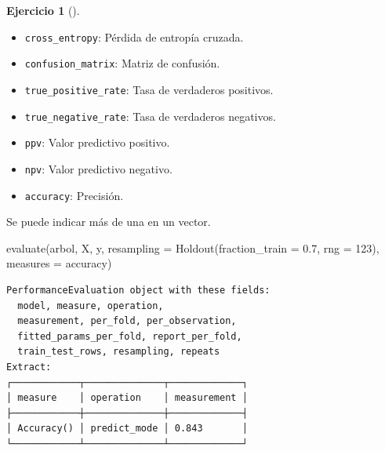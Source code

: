 \documentclass[
  a4paper,
]{scrreport}
\newenvironment{Shaded}{\begin{snugshade}}{\end{snugshade}}
\newcommand{\FloatTok}[1]{\textcolor[rgb]{0.68,0.00,0.00}{#1}}
\newcommand{\FunctionTok}[1]{\textcolor[rgb]{0.28,0.35,0.67}{#1}}
\newcommand{\NormalTok}[1]{\textcolor[rgb]{0.00,0.23,0.31}{#1}}
\newcommand{\OperatorTok}[1]{\textcolor[rgb]{0.37,0.37,0.37}{#1}}
\providecommand{\tightlist}{%
  \setlength{\itemsep}{0pt}\setlength{\parskip}{0pt}}\usepackage{longtable,booktabs,array}
\theoremstyle{definition}
\newtheorem{exercise}{Ejercicio}[chapter]
\theoremstyle{remark}
\begin{document}
\begin{exercise}[]
\begin{enumerate}
\begin{tcolorbox}
\begin{itemize}
    \begin{itemize}
    \tightlist
    \item
      \texttt{cross\_entropy}: Pérdida de entropía cruzada.
    \item
      \texttt{confusion\_matrix}: Matriz de confusión.
    \item
      \texttt{true\_positive\_rate}: Tasa de verdaderos positivos.
    \item
      \texttt{true\_negative\_rate}: Tasa de verdaderos negativos.
    \item
      \texttt{ppv}: Valor predictivo positivo.
    \item
      \texttt{npv}: Valor predictivo negativo.
    \item
      \texttt{accuracy}: Precisión.
    \end{itemize}

    Se puede indicar más de una en un vector.
  \end{itemize}

  \end{tcolorbox}

  \begin{tcolorbox}[enhanced jigsaw, toptitle=1mm, breakable, toprule=.15mm, opacitybacktitle=0.6, coltitle=black, titlerule=0mm, arc=.35mm, title=\textcolor{quarto-callout-tip-color}{\faLightbulb}\hspace{0.5em}{Solución}, rightrule=.15mm, opacityback=0, colback=white, bottomrule=.15mm, leftrule=.75mm, colbacktitle=quarto-callout-tip-color!10!white, bottomtitle=1mm, colframe=quarto-callout-tip-color-frame, left=2mm]

\begin{Shaded}
\begin{Highlighting}[]
\FunctionTok{evaluate}\NormalTok{(arbol, X, y, resampling }\OperatorTok{=} \FunctionTok{Holdout}\NormalTok{(fraction\_train }\OperatorTok{=} \FloatTok{0.7}\NormalTok{, rng }\OperatorTok{=} \FloatTok{123}\NormalTok{), measures }\OperatorTok{=}\NormalTok{ accuracy)}
\end{Highlighting}
\end{Shaded}

\begin{verbatim}
PerformanceEvaluation object with these fields:
  model, measure, operation,
  measurement, per_fold, per_observation,
  fitted_params_per_fold, report_per_fold,
  train_test_rows, resampling, repeats
Extract:
┌────────────┬──────────────┬─────────────┐
│ measure    │ operation    │ measurement │
├────────────┼──────────────┼─────────────┤
│ Accuracy() │ predict_mode │ 0.843       │
└────────────┴──────────────┴─────────────┘
\end{verbatim}


\end{tcolorbox}
\end{enumerate}
\end{exercise}
\end{document}

